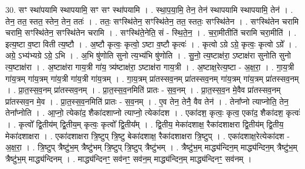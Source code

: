 \documentclass[17pt]{extarticle}
\begin{document}
30. सꣳ स्था॑पयामि स्थापयामि॒ सꣳ सꣳ स्था॑पयामि । . स्था॒प॒या॒मि॒ तेन॒ तेन॑ स्थापयामि स्थापयामि॒ तेन॑ । . तेन॒ तत॒ स्तत॒ स्तेन॒ तेन॒ ततः॑ । . ततः॒ सꣳस्थि॑तेन॒ सꣳस्थि॑तेन॒ तत॒ स्ततः॒ सꣳस्थि॑तेन । . सꣳस्थि॑तेन चरामि चरामि॒ सꣳस्थि॑तेन॒ सꣳस्थि॑तेन चरामि । . सꣳस्थि॑ते॒नेति॒ सं - स्थि॒ते॒न॒ । . च॒रा॒मीतीति॑ चरामि चरा॒मीति॑ । . इत्य॒ष्टा व॒ष्टा विती त्य॒ष्टौ । . अ॒ष्टौ कृत्वः॒ कृत्वो॒ ऽष्टा व॒ष्टौ कृत्वः॑ । . कृत्वो ऽग्रे ऽग्रे॒ कृत्वः॒ कृत्वो ऽग्रे᳚ । . अग्रे॒ ऽभ्य॑भ्यग्रे ऽग्रे॒ ऽभि । . अ॒भि षु॑णोति सुनो त्य॒भ्य॑भि षु॑णोति । . सु॒नो॒ त्य॒ष्टाक्ष॑रा॒ ऽष्टाक्ष॑रा सुनोति सुनो त्य॒ष्टाक्ष॑रा । . अ॒ष्टाक्ष॑रा गाय॒त्री गा॑य॒ त्र्य॑ष्टाक्ष॑रा॒ ऽष्टाक्ष॑रा गाय॒त्री । . अ॒ष्टाक्ष॒रेत्य॒ष्टा - अ॒क्ष॒रा॒ । . गा॒य॒त्री गा॑य॒त्रम् गा॑य॒त्रम् गा॑य॒त्री गा॑य॒त्री गा॑य॒त्रम् । . गा॒य॒त्रम् प्रा॑तस्सव॒नम् प्रा॑तस्सव॒नम् गा॑य॒त्रम् गा॑य॒त्रम् प्रा॑तस्सव॒नम् । . प्रा॒त॒स्स॒व॒नम् प्रा॑तस्सव॒नम् । . प्रा॒त॒स्स॒व॒नमिति॑ प्रातः - स॒व॒नम् । . प्रा॒त॒स्स॒व॒न मे॒वैव प्रा॑तस्सव॒नम् प्रा॑तस्सव॒न मे॒व । . प्रा॒त॒स्स॒व॒नमिति॑ प्रातः - स॒व॒नम् । . ए॒व तेन॒ तेनै॒ वैव तेन॑ । . तेना᳚प्नो त्याप्नोति॒ तेन॒ तेना᳚प्नोति । . आ॒प्नो॒ त्येका॑द॒ शैका॑दशाप्नो त्याप्नो॒ त्येका॑दश । . एका॑दश॒ कृत्वः॒ कृत्व॒ एका॑द॒ शैका॑दश॒ कृत्वः॑ । . कृत्वो᳚ द्वि॒तीय॑म् द्वि॒तीय॒म् कृत्वः॒ कृत्वो᳚ द्वि॒तीय᳚म् । . द्वि॒तीय॒ मेका॑दशाक्ष॒ रैका॑दशाक्षरा द्वि॒तीय॑म् द्वि॒तीय॒ मेका॑दशाक्षरा । . एका॑दशाक्षरा त्रि॒ष्टुप् त्रि॒ष्टु बेका॑दशाक्ष॒ रैका॑दशाक्षरा त्रि॒ष्टुप् । . एका॑दशाक्ष॒रेत्येका॑दश - अ॒क्ष॒रा॒ । . त्रि॒ष्टुप् त्रैष्टु॑भ॒म् त्रैष्टु॑भम् त्रि॒ष्टुप् त्रि॒ष्टुप् त्रैष्टु॑भम् । . त्रैष्टु॑भ॒म् माद्ध्य॑न्दिन॒म् माद्ध्य॑न्दिन॒म् त्रैष्टु॑भ॒म् त्रैष्टु॑भ॒म् माद्ध्य॑न्दिनम् । . माद्ध्य॑न्दिनꣳ॒॒ सव॑नꣳ॒॒ सव॑न॒म् माद्ध्य॑न्दिन॒म् माद्ध्य॑न्दिनꣳ॒॒ सव॑नम् । \newline
\end{document}
